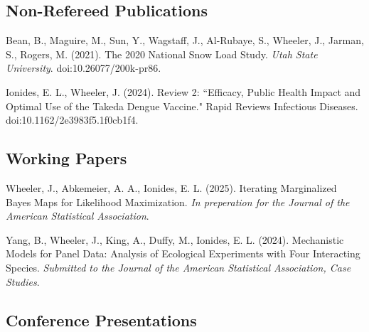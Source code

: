 \documentclass[11pt]{article}
\newenvironment {reflist}
                {
                 \begin{list}{}
                 {\setlength{\labelwidth}{0mm}
                  \setlength{\leftmargin}{8mm}
                  \setlength{\itemindent}{-3mm}
                  \setlength{\labelsep}{0mm}
                  \setlength{\parsep}{0.1 ex}
                  \setlength{\itemsep}{0.1cm}
      \setlength{\topsep}{0.15cm}}} %
   {\end{list}}
\begin{document}
\subsection*{Non-Refereed Publications}

\begin{reflist}

    \item Bean, B., Maguire, M., Sun, Y., Wagstaff, J., Al-Rubaye, S., Wheeler, J., Jarman, S., Rogers, M. (2021). The 2020 National Snow Load Study. {\it Utah State University}. doi:10.26077/200k-pr86.

    \item Ionides, E. L., Wheeler, J. (2024). Review 2: ``Efficacy, Public Health Impact and Optimal Use of the Takeda Dengue Vaccine." Rapid Reviews Infectious Diseases. doi:10.1162/2e3983f5.1f0cb1f4.

\end{reflist}

\subsection*{Working Papers}

\begin{reflist}


    \item Wheeler, J., Abkemeier, A. A., Ionides, E. L. (2025). Iterating Marginalized Bayes Maps for Likelihood Maximization. {\it In preperation for the Journal of the American Statistical Association}.


    \item Yang, B., Wheeler, J., King, A., Duffy, M., Ionides, E. L. (2024). Mechanistic Models for Panel Data: Analysis of Ecological Experiments with Four Interacting Species. {\it Submitted to the Journal of the American Statistical Association, Case Studies}.

\end{reflist}

\subsection*{Conference Presentations}
\end{document}
